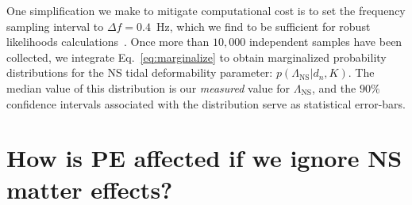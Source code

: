 \documentclass[aps,prd,amsmath,floats,floatfix, twocolumn,
superscriptaddress,nofootinbib,showpacs]{revtex4-1}
\newcommand{\D}{\mathrm{d}}
\newcommand{\lambdans}{\Lambda_\mathrm{NS}}
\newcommand{\LL}{\mathcal{L}}
\begin{document}
% 
% 
% 
% 
One simplification we make to mitigate computational cost is to set the
frequency sampling interval to $\Delta f=0.4$~Hz, which we find to be
sufficient for robust likelihoods calculations~\cite{Purrer:2015nkh}.
Once more than $10,000$ independent samples have been collected, we integrate
Eq.~\ref{eq:marginalize} to obtain marginalized probability distributions
for the NS tidal deformability parameter: $p(\lambdans|d_n,K)$.
The median value of this distribution is our {\it measured} value for
$\lambdans$, and the $90\%$ confidence intervals associated with the distribution
serve as statistical error-bars.
% 




\section{How is PE affected if we ignore NS matter effects?}\label{s1:PEwithnoNS}
\end{document}
